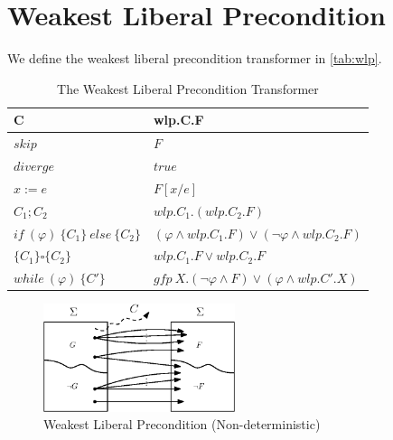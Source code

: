 \section{Weakest Liberal Precondition}
We define the weakest liberal precondition transformer in \autoref{tab:wlp}. 
\begin{table}[ht!]\centering
    \begin{tabular}{ll}
    \hline\hline
      \textbf{C}&\textbf{wlp.C.F}    \\ \hline
      $skip$&   $F$   \\
      $diverge$&  $true$\\
      $x:= e $&  $F[x/e]$\\
      $C_1;C_2$&  $wlp.C_1.(wlp.C_2.F)$\\
      $if\ (\varphi)\ \{C_1\}\ else\ \{C_2\} $&  $(\varphi\wedge wlp.C_1.F)\vee(\neg\varphi\wedge wlp.C_2.F)$\\
      $\{C_1\}\square \{C_2\}$ & $wlp.C_1.F\vee wlp.C_2.F$\\
      $while\ (\varphi)\ \{C'\}$&  $gfp\ X.(\neg\varphi\wedge F)\vee(\varphi\wedge wlp.C'.X)$\\
      \hline\hline
    \end{tabular}
    \caption{The Weakest Liberal Precondition Transformer}
    \label{tab:wlp}
\end{table}

\begin{figure}[ht!]\centering
\includegraphics[width=0.5\textwidth]{image/wlp-nondet.eps}
\caption{Weakest Liberal Precondition (Non-deterministic)}
\label{fig:wlp-nondet}
\end{figure}

